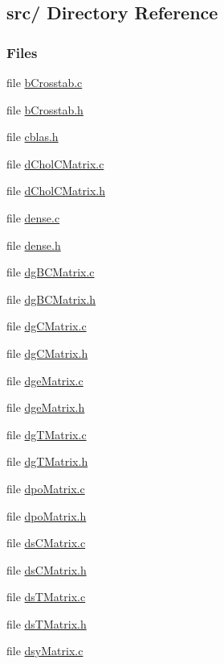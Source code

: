 \hypertarget{dir_000000}{
\subsection{src/ Directory Reference}
\label{dir_000000}
}
\subsubsection*{Files}
\begin{CompactItemize}
\item 
file \hyperlink{bCrosstab_8c}{b\-Crosstab.c}
\item 
file \hyperlink{bCrosstab_8h}{b\-Crosstab.h}
\item 
file \hyperlink{cblas_8h}{cblas.h}
\item 
file \hyperlink{dCholCMatrix_8c}{d\-Chol\-CMatrix.c}
\item 
file \hyperlink{dCholCMatrix_8h}{d\-Chol\-CMatrix.h}
\item 
file \hyperlink{dense_8c}{dense.c}
\item 
file \hyperlink{dense_8h}{dense.h}
\item 
file \hyperlink{dgBCMatrix_8c}{dg\-BCMatrix.c}
\item 
file \hyperlink{dgBCMatrix_8h}{dg\-BCMatrix.h}
\item 
file \hyperlink{dgCMatrix_8c}{dg\-CMatrix.c}
\item 
file \hyperlink{dgCMatrix_8h}{dg\-CMatrix.h}
\item 
file \hyperlink{dgeMatrix_8c}{dge\-Matrix.c}
\item 
file \hyperlink{dgeMatrix_8h}{dge\-Matrix.h}
\item 
file \hyperlink{dgTMatrix_8c}{dg\-TMatrix.c}
\item 
file \hyperlink{dgTMatrix_8h}{dg\-TMatrix.h}
\item 
file \hyperlink{dpoMatrix_8c}{dpo\-Matrix.c}
\item 
file \hyperlink{dpoMatrix_8h}{dpo\-Matrix.h}
\item 
file \hyperlink{dsCMatrix_8c}{ds\-CMatrix.c}
\item 
file \hyperlink{dsCMatrix_8h}{ds\-CMatrix.h}
\item 
file \hyperlink{dsTMatrix_8c}{ds\-TMatrix.c}
\item 
file \hyperlink{dsTMatrix_8h}{ds\-TMatrix.h}
\item 
file \hyperlink{dsyMatrix_8c}{dsy\-Matrix.c}
\item 

\end{CompactItemize}
